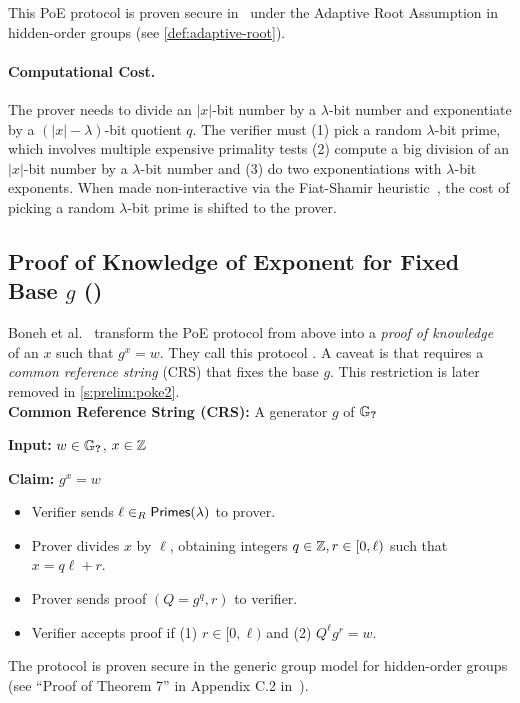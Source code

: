 This PoE protocol is proven secure in~\cite{Wesolowski19} under the Adaptive Root Assumption in hidden-order groups (see \cref{def:adaptive-root}).

\paragraph{Computational Cost.}
The prover needs to divide an $|x|$-bit number by a $\lambda$-bit number and exponentiate by a $(|x|-\lambda)$-bit quotient $q$.
The verifier must (1) pick a random $\lambda$-bit prime, which involves multiple expensive primality tests (2) compute a big division of an $|x|$-bit number by a $\lambda$-bit number and (3) do two exponentiations with $\lambda$-bit exponents.
When made non-interactive via the Fiat-Shamir heuristic~\cite{FS87}, the cost of picking a random $\lambda$-bit prime is shifted to the prover.

\subsection{Proof of Knowledge of Exponent for Fixed Base $g$ (\pokestar)}
\label{s:prelim:pokestar}
Boneh et al.~\cite{BBF19} transform the PoE protocol from above into a \textit{proof of knowledge}~\cite{GMR85} of an $x$ such that $g^x = w$.
They call this protocol \pokestar.
A caveat is that \pokestar requires a \textit{common reference string} (CRS) that fixes the base $g$.
This restriction is later removed in \cref{s:prelim:poke2}.\\

\noindent \textbf{Common Reference String (CRS):} A generator $g$ of $\mathbb{G}_{\textbf{?}}$

\noindent \textbf{Input:} $w\in \mathbb{G}_{\textbf{?}}$, $x\in \mathbb{Z}$

\noindent \textbf{Claim:} $g^x = w$
\begin{itemize}
\item Verifier sends $\ell \in_R \mathsf{Primes}(\lambda)$ to prover.
\item Prover divides $x$ by $\ell$, obtaining integers $q\in \mathbb{Z},r\in [0,\ell)$ such that $x = q\ell + r$.
\item Prover sends proof $(Q=g^{q},r)$ to verifier.
\item Verifier accepts proof  if (1) $r \in [0, \ell)$ and (2) $Q^\ell g^{r} = w$.
\end{itemize}

The \pokestar protocol is proven secure in the generic group model for hidden-order groups (see ``Proof of Theorem 7'' in Appendix C.2 in~\cite{BBF18}).

